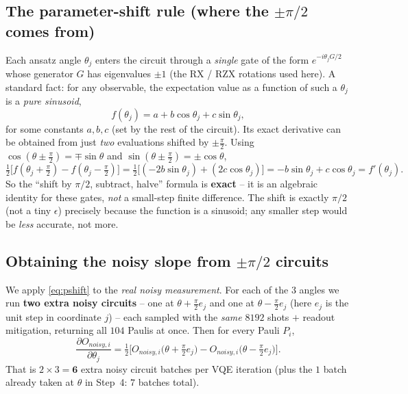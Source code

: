 \documentclass[11pt]{article}
\def\bm#1{#1}%
\def\mathrm#1{#1}%
\begin{document}
\subsection{The parameter-shift rule (where the \texorpdfstring{$\pm\pi/2$}{+-pi/2} comes from)}
\label{sec:pshift}
Each ansatz angle $\theta_j$ enters the circuit through a \emph{single} gate of
the form $e^{-i\theta_j G/2}$ whose generator $G$ has eigenvalues $\pm1$ (the
RX / RZX rotations used here). A standard fact: for any observable, the
expectation value as a function of such a $\theta_j$ is a \emph{pure sinusoid},
\begin{equation}
f(\theta_j)=a+b\cos\theta_j+c\sin\theta_j,
\end{equation}
for some constants $a,b,c$ (set by the rest of the circuit). Its exact derivative
can be obtained from just \emph{two} evaluations shifted by $\pm\tfrac\pi2$.
Using $\cos(\theta\pm\tfrac\pi2)=\mp\sin\theta$ and
$\sin(\theta\pm\tfrac\pi2)=\pm\cos\theta$,
\begin{equation}
\tfrac12\big[f(\theta_j+\tfrac\pi2)-f(\theta_j-\tfrac\pi2)\big]
=\tfrac12\big[(-2b\sin\theta_j)+(2c\cos\theta_j)\big]
=-b\sin\theta_j+c\cos\theta_j
=f'(\theta_j).
\label{eq:pshift}
\end{equation}
So the ``shift by $\pi/2$, subtract, halve'' formula is \textbf{exact} -- it is an
algebraic identity for these gates, \emph{not} a small-step finite difference.
The shift is exactly $\pi/2$ (not a tiny $\epsilon$) precisely because the
function is a sinusoid; any smaller step would be \emph{less} accurate, not more.

\subsection{Obtaining the noisy slope from \texorpdfstring{$\pm\pi/2$}{+-pi/2} circuits}
\label{sec:noisy-slope}
We apply \eqref{eq:pshift} to the \emph{real noisy measurement}. For each of the
$3$ angles we run \textbf{two extra noisy circuits} -- one at
$\bm\theta+\tfrac\pi2\bm e_j$ and one at $\bm\theta-\tfrac\pi2\bm e_j$ (here
$\bm e_j$ is the unit step in coordinate $j$) -- each sampled with the \emph{same}
$8192$ shots $+$ readout mitigation, returning all $104$ Paulis at once. Then for
every Pauli $P_i$,
\begin{equation}
\boxed{\;\frac{\partial O_{\mathrm{noisy},i}}{\partial\theta_j}
=\tfrac12\Big[O_{\mathrm{noisy},i}\big(\bm\theta+\tfrac\pi2\bm e_j\big)
-O_{\mathrm{noisy},i}\big(\bm\theta-\tfrac\pi2\bm e_j\big)\Big].\;}
\label{eq:noisy-slope}
\end{equation}
That is $2\times3=\mathbf{6}$ extra noisy circuit batches per VQE iteration (plus
the $1$ batch already taken at $\bm\theta$ in Step~4: $7$ batches total).
\end{document}
